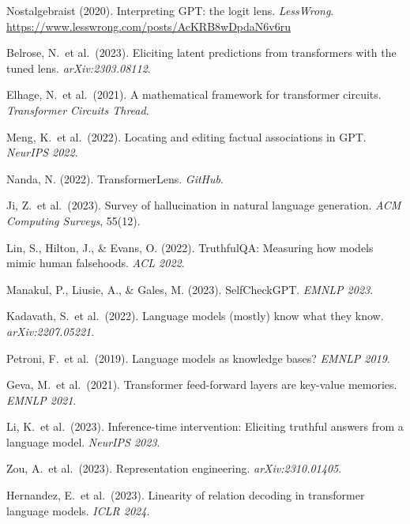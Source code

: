 \documentclass{article}
\begin{document}
{\small
\begin{enumerate}[leftmargin=*,label={[\arabic*]},itemsep=1pt]
\item \label{nostalgebraist2020logitlens}
  Nostalgebraist (2020). Interpreting GPT: the logit lens.
  \textit{LessWrong}. \url{https://www.lesswrong.com/posts/AcKRB8wDpdaN6v6ru}
\item \label{belrose2023eliciting}
  Belrose, N.\ et al.\ (2023). Eliciting latent predictions from
  transformers with the tuned lens. \textit{arXiv:2303.08112}.
\item \label{elhage2021mathematical}
  Elhage, N.\ et al.\ (2021). A mathematical framework for transformer
  circuits. \textit{Transformer Circuits Thread}.
\item \label{meng2022locating}
  Meng, K.\ et al.\ (2022). Locating and editing factual associations
  in GPT. \textit{NeurIPS 2022}.
\item \label{nanda2022transformerlens}
  Nanda, N. (2022). TransformerLens. \textit{GitHub}.
\item \label{ji2023survey}
  Ji, Z.\ et al.\ (2023). Survey of hallucination in natural language
  generation. \textit{ACM Computing Surveys}, 55(12).
\item \label{lin2022truthfulqa}
  Lin, S., Hilton, J., \& Evans, O. (2022). TruthfulQA: Measuring how
  models mimic human falsehoods. \textit{ACL 2022}.
\item \label{manakul2023selfcheckgpt}
  Manakul, P., Liusie, A., \& Gales, M. (2023). SelfCheckGPT.
  \textit{EMNLP 2023}.
\item \label{kadavath2022language}
  Kadavath, S.\ et al.\ (2022). Language models (mostly) know what
  they know. \textit{arXiv:2207.05221}.
\item \label{petroni2019language}
  Petroni, F.\ et al.\ (2019). Language models as knowledge bases?
  \textit{EMNLP 2019}.
\item \label{geva2021transformer}
  Geva, M.\ et al.\ (2021). Transformer feed-forward layers are
  key-value memories. \textit{EMNLP 2021}.
\item \label{li2023inference}
  Li, K.\ et al.\ (2023). Inference-time intervention: Eliciting
  truthful answers from a language model. \textit{NeurIPS 2023}.
\item \label{zou2023representation}
  Zou, A.\ et al.\ (2023). Representation engineering.
  \textit{arXiv:2310.01405}.
\item \label{hernandez2023linearity}
  Hernandez, E.\ et al.\ (2023). Linearity of relation decoding in
  transformer language models. \textit{ICLR 2024}.
\end{enumerate}
}
\end{document}
